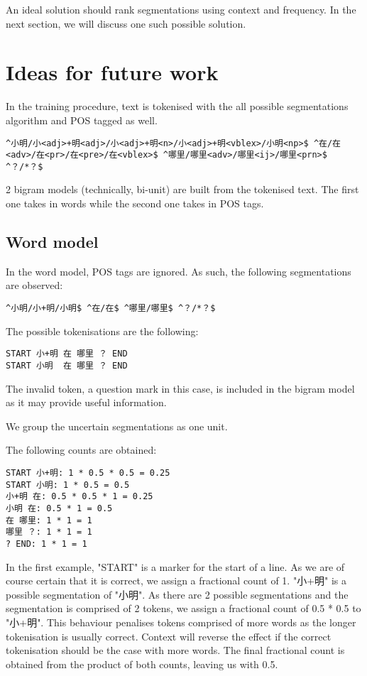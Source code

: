 \documentclass{article}
\begin{document}
An ideal solution should rank segmentations using context
and frequency. In the next section, we will discuss one such possible
solution.

\section{Ideas for future work}

In the training procedure, text is tokenised with the all possible
segmentations algorithm and POS tagged as well.

\begin{verbatim}
^小明/小<adj>+明<adj>/小<adj>+明<n>/小<adj>+明<vblex>/小明<np>$ ^在/在<adv>/在<pr>/在<pre>/在<vblex>$ ^哪里/哪里<adv>/哪里<ij>/哪里<prn>$ ^？/*？$ 
\end{verbatim}

2 bigram models (technically, bi-unit) are built from the tokenised text. The first one takes in words while the second one takes in POS tags.

\subsection{Word model}

In the word model, POS tags are ignored. As such, the following segmentations are observed:

\begin{verbatim}
^小明/小+明/小明$ ^在/在$ ^哪里/哪里$ ^？/*？$ 
\end{verbatim}

The possible tokenisations are the following:

\begin{verbatim}
START 小+明 在 哪里 ？ END
START 小明  在 哪里 ？ END
\end{verbatim}

The invalid token, a question mark in this case, is included in the bigram model as it may provide useful information.

We group the uncertain segmentations as one unit.

The following counts are obtained:

\begin{verbatim}
START 小+明: 1 * 0.5 * 0.5 = 0.25
START 小明: 1 * 0.5 = 0.5
小+明 在: 0.5 * 0.5 * 1 = 0.25
小明 在: 0.5 * 1 = 0.5
在 哪里: 1 * 1 = 1
哪里 ？: 1 * 1 = 1
? END: 1 * 1 = 1
\end{verbatim}

In the first example, "START" is a marker for the start of a line. As we are of course certain that it is correct, we assign a fractional count of 1.
"小+明" is a possible segmentation of "小明".
As there are 2 possible segmentations and the segmentation is comprised of 2 tokens, we assign a fractional count of 0.5 * 0.5 to "小+明". This behaviour penalises tokens comprised of more words as the longer tokenisation is usually correct. Context will reverse the effect if the correct tokenisation should be the case with more words.
The final fractional count is obtained from the product of both counts, leaving us with 0.5.
\end{document}
